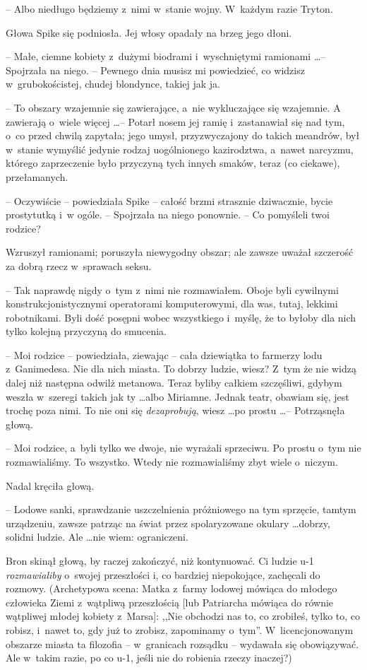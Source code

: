 \documentclass[oneside,polish,11pt,rmheadings]{mwbk}
\begin{document}
-- Albo niedługo będziemy z~nimi w~stanie wojny. W~każdym razie Tryton. 

Głowa Spike się podniosła. Jej włosy opadały na brzeg jego dłoni. 

-- Małe, ciemne kobiety z~dużymi biodrami i~wyschniętymi ramionami \ldots   -- Spojrzała na niego. -- Pewnego dnia musisz mi powiedzieć, co widzisz w~grubokościstej, chudej blondynce, takiej jak ja. 

-- To obszary wzajemnie się zawierające, a~nie wykluczające się wzajemnie. A zawierają o~wiele więcej \ldots  -- Potarł nosem jej ramię i~zastanawiał się nad tym, o~co przed chwilą zapytała; jego umysł, przyzwyczajony do takich meandrów, był w~stanie wymyślić jedynie rodzaj uogólnionego kazirodztwa, a~nawet narcyzmu, którego zaprzeczenie było przyczyną tych innych smaków, teraz (co ciekawe), przełamanych. 

-- Oczywiście -- powiedziała Spike -- całość brzmi strasznie dziwacznie, bycie prostytutką i~w ogóle. -- Spojrzała na niego ponownie. -- Co pomyśleli twoi rodzice? 

Wzruszył ramionami; poruszyła niewygodny obszar; ale zawsze uważał szczerość za dobrą rzecz w~sprawach seksu. 

-- Tak naprawdę nigdy o~tym z~nimi nie rozmawiałem. Oboje byli cywilnymi konstrukcjonistycznymi operatorami komputerowymi, dla was, tutaj, lekkimi robotnikami. Byli dość posępni wobec wszystkiego i~myślę, że to byłoby dla nich tylko kolejną przyczyną do smucenia. 

-- Moi rodzice -- powiedziała, ziewając -- cała dziewiątka to farmerzy lodu z~Ganimedesa. Nie dla nich miasta. To dobrzy ludzie, wiesz? Z~tym że nie widzą dalej niż następna odwilż metanowa. Teraz byliby całkiem szczęśliwi, gdybym weszła w~szeregi takich jak ty \ldots  albo Miriamne. Jednak teatr, obawiam się, jest trochę poza nimi. To nie oni się \textit{dezaprobują}, wiesz \ldots  po prostu \ldots  -- Potrząsnęła głową. 

-- Moi rodzice, a~byli tylko we dwoje, nie wyrażali sprzeciwu. Po prostu o~tym nie rozmawialiśmy. To wszystko. Wtedy nie rozmawialiśmy zbyt wiele o~niczym. 

Nadal kręciła głową.

-- Lodowe sanki, sprawdzanie uszczelnienia próżniowego na tym sprzęcie, tamtym urządzeniu, zawsze patrząc na świat przez spolaryzowane okulary \ldots  dobrzy, solidni ludzie. Ale \ldots  nie wiem: ograniczeni. 

Bron skinął głową, by raczej zakończyć, niż kontynuować. Ci ludzie u-1 \textit{rozmawialiby} o~swojej przeszłości i, co bardziej niepokojące, zachęcali do rozmowy. (Archetypowa scena: Matka z~farmy lodowej mówiąca do młodego człowieka Ziemi z~wątpliwą przeszłością [lub Patriarcha mówiąca do równie wątpliwej młodej kobiety z~Marsa]: ,,Nie obchodzi nas to, co zrobiłeś, tylko to, co robisz, i~nawet to, gdy już to zrobisz, zapominamy o~tym''. W~licencjonowanym obszarze miasta ta filozofia -- w~granicach rozsądku -- wydawała się obowiązywać. Ale w~takim razie, po co u-1, jeśli nie do robienia rzeczy inaczej?)
\end{document}
